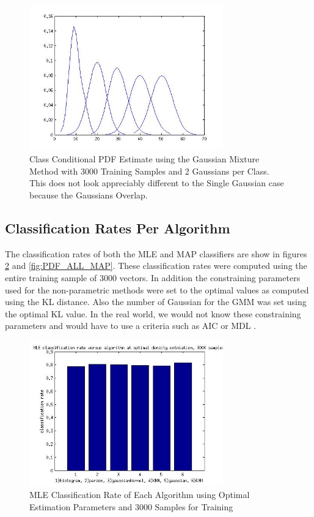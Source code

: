 \documentclass[journal]{IEEEtran}
\begin{document}
\begin{figure}
\centering
\includegraphics[width=3.3in]{../images/conditional_using_gaussmixture_emalgo.jpg}
\caption{Class Conditional PDF Estimate using the Gaussian Mixture Method with 3000 Training Samples and 2 Gaussians per Class. This does not look appreciably different to the Single Gaussian case because the Gaussians Overlap.}
\label{fig:6}
\end{figure}

\subsection{Classification Rates Per Algorithm}
\par The classification rates of both the MLE and MAP classifiers are show in figures \ref{fig:PDF_ALL_MLE} and \ref{fig:PDF_ALL_MAP}. These classification rates were computed using the entire training sample of 3000 vectors. In addition the constraining parameters used for the non-parametric methods were set to the optimal values as computed using the KL distance. Also the number of Gaussian for the GMM was set using the optimal KL value. In the real world, we would not know these constraining parameters and would have to use a criteria such as AIC or MDL \cite{densityhandout}.


\begin{figure}
\centering
\includegraphics[width=3.3in]{../images/all_algos_mle.jpg}
\caption{MLE Classification Rate of Each Algorithm using Optimal Estimation Parameters and 3000 Samples for Training}
\label{fig:PDF_ALL_MLE}
\end{figure}
\end{document}
